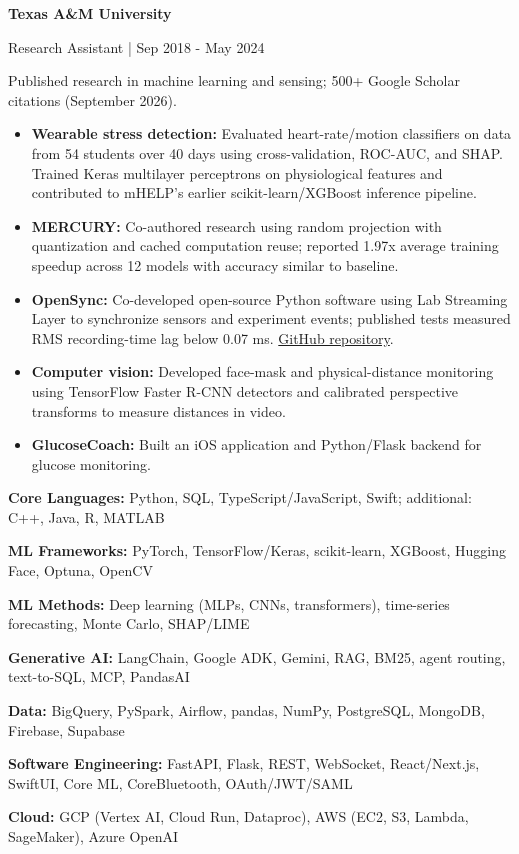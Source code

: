 \documentclass[letterpaper,11pt]{article}
\newcommand{\ressection}[1]{\par\addvspace{8pt}\needspace{3\baselineskip}{\fontsize{11.5}{14}\selectfont\bfseries #1}\par\nobreak}
\newcommand{\employer}[1]{\par\addvspace{3pt}\needspace{4\baselineskip}\textbf{#1}\par\nobreak}
\begin{document}
\employer{Texas A\&M University}
Research Assistant | Sep 2018 - May 2024\par
Published research in machine learning and sensing; 500+ Google Scholar citations (September 2026).\par
\begin{itemize}
\item \textbf{Wearable stress detection:} Evaluated heart-rate/motion classifiers on data from 54 students over 40 days using cross-validation, ROC-AUC, and SHAP. Trained Keras multilayer perceptrons on physiological features and contributed to mHELP's earlier scikit-learn/XGBoost inference pipeline.
\item \textbf{MERCURY:} Co-authored research using random projection with quantization and cached computation reuse; reported 1.97x average training speedup across 12 models with accuracy similar to baseline.
\item \textbf{OpenSync:} Co-developed open-source Python software using Lab Streaming Layer to synchronize sensors and experiment events; published tests measured RMS recording-time lag below 0.07 ms. \href{https://github.com/TAMUCogLab/OpenSync}{GitHub repository}.
\item \textbf{Computer vision:} Developed face-mask and physical-distance monitoring using TensorFlow Faster R-CNN detectors and calibrated perspective transforms to measure distances in video.
\item \textbf{GlucoseCoach:} Built an iOS application and Python/Flask backend for glucose monitoring.
\end{itemize}
\ressection{Technical Skills}
\textbf{Core Languages:} Python, SQL, TypeScript/JavaScript, Swift; additional: C++, Java, R, MATLAB\par
\textbf{ML Frameworks:} PyTorch, TensorFlow/Keras, scikit-learn, XGBoost, Hugging Face, Optuna, OpenCV\par
\textbf{ML Methods:} Deep learning (MLPs, CNNs, transformers), time-series forecasting, Monte Carlo, SHAP/LIME\par
\textbf{Generative AI:} LangChain, Google ADK, Gemini, RAG, BM25, agent routing, text-to-SQL, MCP, PandasAI\par
\textbf{Data:} BigQuery, PySpark, Airflow, pandas, NumPy, PostgreSQL, MongoDB, Firebase, Supabase\par
\textbf{Software Engineering:} FastAPI, Flask, REST, WebSocket, React/Next.js, SwiftUI, Core ML, CoreBluetooth, OAuth/JWT/SAML\par
\textbf{Cloud:} GCP (Vertex AI, Cloud Run, Dataproc), AWS (EC2, S3, Lambda, SageMaker), Azure OpenAI\par
\end{document}
